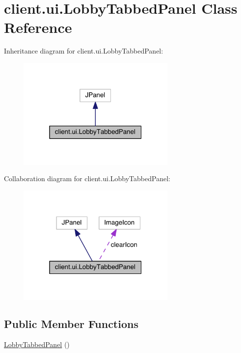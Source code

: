 \hypertarget{classclient_1_1ui_1_1_lobby_tabbed_panel}{}\section{client.\+ui.\+Lobby\+Tabbed\+Panel Class Reference}
\label{classclient_1_1ui_1_1_lobby_tabbed_panel}


Inheritance diagram for client.\+ui.\+Lobby\+Tabbed\+Panel\+:
\nopagebreak
\begin{figure}[H]
\begin{center}
\leavevmode
\includegraphics[width=220pt]{classclient_1_1ui_1_1_lobby_tabbed_panel__inherit__graph}
\end{center}
\end{figure}


Collaboration diagram for client.\+ui.\+Lobby\+Tabbed\+Panel\+:
\nopagebreak
\begin{figure}[H]
\begin{center}
\leavevmode
\includegraphics[width=220pt]{classclient_1_1ui_1_1_lobby_tabbed_panel__coll__graph}
\end{center}
\end{figure}
\subsection*{Public Member Functions}
\begin{DoxyCompactItemize}
\item 
\hyperlink{classclient_1_1ui_1_1_lobby_tabbed_panel_ace5183afecd36f1f1cc30483249ee952}{Lobby\+Tabbed\+Panel} ()
\end{DoxyCompactItemize}


